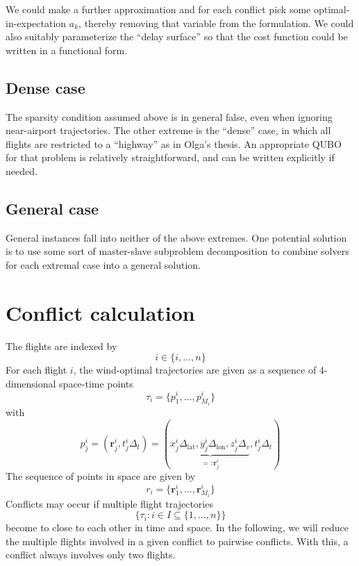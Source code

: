 \documentclass{article}
\begin{document}
We could make a further approximation and for each conflict pick some optimal-in-expectation $a_k$, thereby removing that variable from the formulation.
We could also suitably parameterize the ``delay surface'' so that the cost function could be written in a functional form.

\subsection{Dense case}
The sparsity condition assumed above is in general false, even when ignoring near-airport trajectories.
The other extreme is the ``dense'' case, in which all flights are restricted to a ``highway'' as in Olga's thesis.
An appropriate QUBO for that problem is relatively straightforward, and can be written explicitly if needed.

\subsection{General case}
General instances fall into neither of the above extremes.
One potential solution is to use some sort of master-slave subproblem decomposition to combine solvers for each extremal case into a general solution.

\section{Conflict calculation}
The flights are indexed by
\begin{equation*}
    i \in \{i, \dots, n\}
\end{equation*}
For each flight $i$, the wind-optimal trajectories are given as a sequence of 4-dimensional space-time points
\begin{equation*}
    \tau_i = \{p^i_1, \dots, p^i_{M_i}\}
\end{equation*}
with
\begin{equation*}
    p^i_j = (\mathbf{r}^i_j, t^i_j \Delta_t) = \left( \underbrace{x^i_j \Delta_\text{lat}, y^i_j \Delta_\text{lon}, z^i_j \Delta_v}_{=:\mathbf{r}^i_j}, t^i_j \Delta_t\right)
\end{equation*}
The sequence of points in space are given by
\begin{equation*}
    r_i = \{\mathbf{r}^i_1, \dots, \mathbf{r}^i_{M_i}\}
\end{equation*}
Conflicts may occur if multiple flight trajectories
\begin{equation*}
    \{\tau_i : i \in I \subseteq \{1, \dots, n\}\}
\end{equation*}
become to close to each other in time and space.
In the following, we will reduce the multiple flights involved in a given conflict to pairwise conflicts.
With this, a conflict always involves only two flights.
\end{document}
